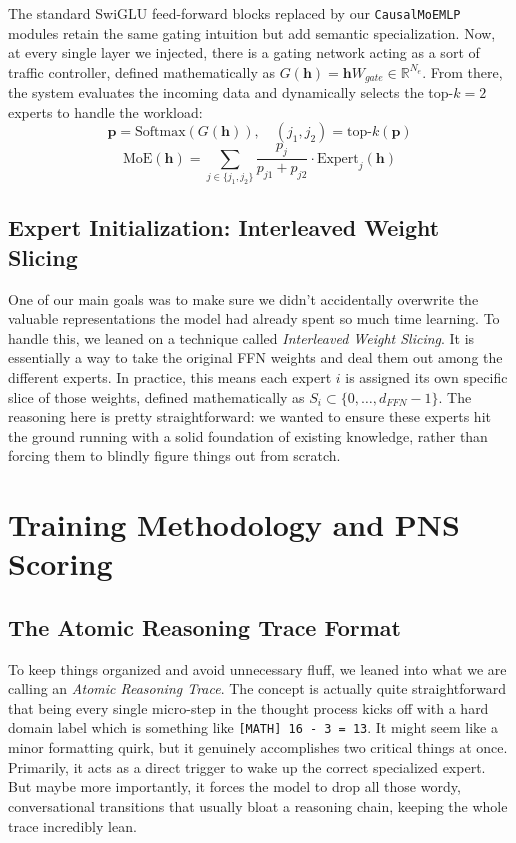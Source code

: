 \documentclass[conference,compsoc]{IEEEtran}
\begin{document}
The standard SwiGLU feed-forward blocks \cite{b19} replaced by our \texttt{CausalMoEMLP} modules retain the same gating intuition but add semantic specialization. Now, at every single layer we injected, there is a gating network acting as a sort of traffic controller, defined mathematically as $G(\mathbf{h}) = \mathbf{h} W_{gate} \in \mathbb{R}^{N_e}$. From there, the system evaluates the incoming data and dynamically selects the top-$k=2$ experts to handle the workload:
\begin{equation}
\mathbf{p} = \text{Softmax}(G(\mathbf{h})), \quad (j_1, j_2) = \text{top-}k(\mathbf{p})
\end{equation}
\begin{equation}
\text{MoE}(\mathbf{h}) = \sum_{j \in \{j_1, j_2\}} \frac{p_j}{p_{j1} + p_{j2}} \cdot \text{Expert}_j(\mathbf{h})
\end{equation}

\subsection{Expert Initialization: Interleaved Weight Slicing}
One of our main goals was to make sure we didn't accidentally overwrite the valuable representations the model had already spent so much time learning. To handle this, we leaned on a technique called \textit{Interleaved Weight Slicing}. It is essentially a way to take the original FFN weights and deal them out among the different experts. In practice, this means each expert $i$ is assigned its own specific slice of those weights, defined mathematically as $S_i \subset \{0, \ldots, d_{FFN}-1\}$. The reasoning here is pretty straightforward: we wanted to ensure these experts hit the ground running with a solid foundation of existing knowledge, rather than forcing them to blindly figure things out from scratch.

\section{Training Methodology and PNS Scoring}

\subsection{The Atomic Reasoning Trace Format}
To keep things organized and avoid unnecessary fluff, we leaned into what we are calling an \textit{Atomic Reasoning Trace}. The concept is actually quite straightforward that being every single micro-step in the thought process kicks off with a hard domain label which is something like \texttt{[MATH] 16 - 3 = 13}. It might seem like a minor formatting quirk, but it genuinely accomplishes two critical things at once. Primarily, it acts as a direct trigger to wake up the correct specialized expert. But maybe more importantly, it forces the model to drop all those wordy, conversational transitions that usually bloat a reasoning chain, keeping the whole trace incredibly lean.
\end{document}
